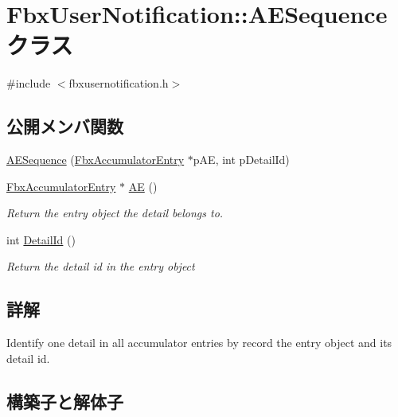 \hypertarget{class_fbx_user_notification_1_1_a_e_sequence}{}\section{Fbx\+User\+Notification\+:\+:A\+E\+Sequence クラス}
\label{class_fbx_user_notification_1_1_a_e_sequence}


{\ttfamily \#include $<$fbxusernotification.\+h$>$}

\subsection*{公開メンバ関数}
\begin{DoxyCompactItemize}
\item 
\hyperlink{class_fbx_user_notification_1_1_a_e_sequence_a88b22a1de4aec9c4c51f5a09e6821160}{A\+E\+Sequence} (\hyperlink{class_fbx_accumulator_entry}{Fbx\+Accumulator\+Entry} $\ast$p\+AE, int p\+Detail\+Id)
\item 
\hyperlink{class_fbx_accumulator_entry}{Fbx\+Accumulator\+Entry} $\ast$ \hyperlink{class_fbx_user_notification_1_1_a_e_sequence_a62caeec18280c5f51f0d44b6a9cab155}{AE} ()
\begin{DoxyCompactList}\small\item\em Return the entry object the detail belongs to. \end{DoxyCompactList}\item 
int \hyperlink{class_fbx_user_notification_1_1_a_e_sequence_ad3052bbb86f4b73424e0f00a52f27218}{Detail\+Id} ()
\begin{DoxyCompactList}\small\item\em Return the detail id in the entry object \end{DoxyCompactList}\end{DoxyCompactItemize}


\subsection{詳解}
Identify one detail in all accumulator entries by record the entry object and its detail id. 

\subsection{構築子と解体子}
\mbox{\label{class_fbx_user_notification_1_1_a_e_sequence_a88b22a1de4aec9c4c51f5a09e6821160}} 

